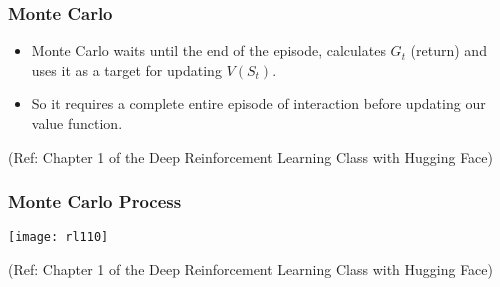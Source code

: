 \begin{frame}[fragile]\frametitle{Monte Carlo}


\begin{itemize}
\item Monte Carlo waits until the end of the episode, calculates $G_t$ (return) and uses it as a target for updating $V(S_t)$.
\item So it requires a complete entire episode of interaction before updating our value function.
\end{itemize}

{\tiny (Ref: Chapter 1 of the Deep Reinforcement Learning Class with Hugging Face)}


\end{frame}

\begin{frame}[fragile]\frametitle{Monte Carlo Process}


\begin{center}
\texttt{[image: rl110]}
\end{center}


{\tiny (Ref: Chapter 1 of the Deep Reinforcement Learning Class with Hugging Face)}

\end{frame}


